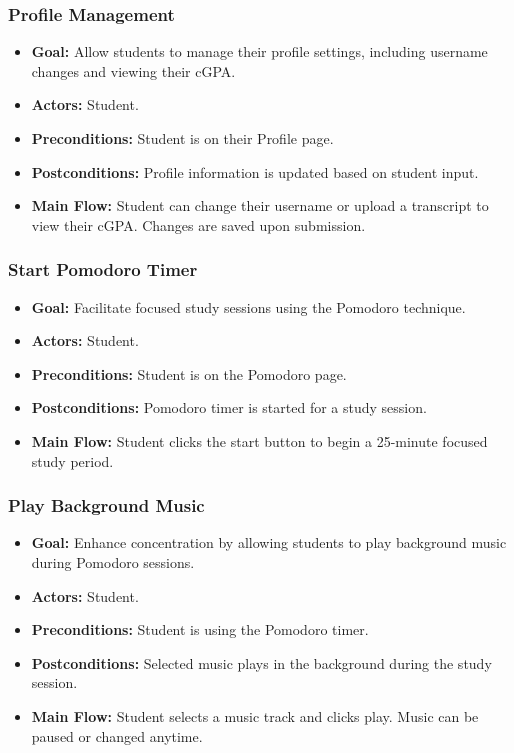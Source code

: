 \documentclass[12pt]{article}
\begin{document}
\subsubsection{Profile Management}
\begin{itemize}
    \item \textbf{Goal:} Allow students to manage their profile settings, including username changes and viewing their cGPA.
    \item \textbf{Actors:} Student.
    \item \textbf{Preconditions:} Student is on their Profile page.
    \item \textbf{Postconditions:} Profile information is updated based on student input.
    \item \textbf{Main Flow:} Student can change their username or upload a transcript to view their cGPA. Changes are saved upon submission.
\end{itemize}

\subsubsection{Start Pomodoro Timer}
\begin{itemize}
    \item \textbf{Goal:} Facilitate focused study sessions using the Pomodoro technique.
    \item \textbf{Actors:} Student.
    \item \textbf{Preconditions:} Student is on the Pomodoro page.
    \item \textbf{Postconditions:} Pomodoro timer is started for a study session.
    \item \textbf{Main Flow:} Student clicks the start button to begin a 25-minute focused study period.
\end{itemize}

\subsubsection{Play Background Music}
\begin{itemize}
    \item \textbf{Goal:} Enhance concentration by allowing students to play background music during Pomodoro sessions.
    \item \textbf{Actors:} Student.
    \item \textbf{Preconditions:} Student is using the Pomodoro timer.
    \item \textbf{Postconditions:} Selected music plays in the background during the study session.
    \item \textbf{Main Flow:} Student selects a music track and clicks play. Music can be paused or changed anytime.
\end{itemize}
\end{document}
